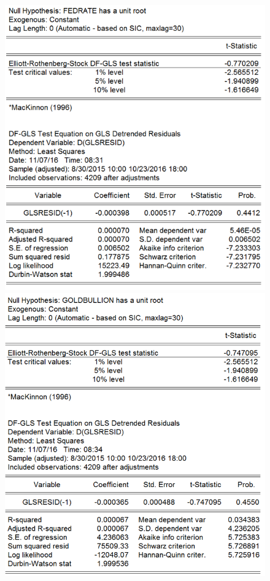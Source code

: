 \documentclass[11pt]{report}
\begin{document}
\begin{figure}[!h]
\begin{minipage}[c]{.46\linewidth}
\includegraphics[scale=0.5]{Appendix/chap2/5}
\end{minipage} \hfill
\begin{minipage}[c]{.46\linewidth}
\includegraphics[scale=0.5]{Appendix/chap2/6}
\end{minipage} \hfill
\end{figure}
\end{document}
